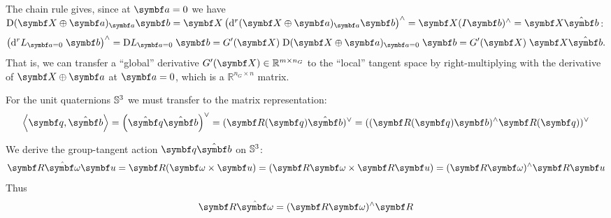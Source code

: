 The chain rule gives, since at $\a = 0$ we have $\mathrm{D} (\X \oplus \a)_\a \b = \X \left( \mathrm{d}^r (\X \oplus \a)_\a \b \right)^\wedge = \X (I \b)^\wedge = \X \hat \b$:
\begin{equation}
  \left( \mathrm{d}^r L_{\a = 0} \; \b \right)^\wedge = \mathrm{D} L_{\a = 0} \; \b = G'(\X) \; \mathrm{D} (\X \oplus \a)_{\a = 0} \; \b = G'(\X) \; \X \hat \b.
\end{equation}
That is, we can transfer a ``global'' derivative $G'(\X) \in \mathbb{R}^{m \times n_G}$ to the ``local'' tangent space by right-multiplying with the derivative of $\X \oplus \a$ at $\a = 0$, which is a $\mathbb{R}^{n_G \times n}$ matrix.

\begin{example}
  For the unit quaternions ${\mathbb{S}^3}$ we must transfer to the matrix representation:
  \begin{equation}
    \left \langle \bq, \hat \b \right \rangle = \left( \hat \bq \hat \b \right)^\vee = (\bR(\bq) \hat \b)^\vee = ((\bR (\bq) \b)^\wedge \bR (\bq))^\vee
  \end{equation}
\end{example}

We derive the group-tangent action $\bq \hat \b$ on ${\mathbb{S}^3}$:
\begin{equation}
  \bR \hat \bomega \bu = \bR (\bomega \times \bu) = (\bR \bomega \times \bR \bu) = (\bR \bomega)^\wedge \bR \bu
\end{equation}
Thus
\begin{equation}
  \bR \hat \bomega = (\bR \bomega)^\wedge \bR
\end{equation}